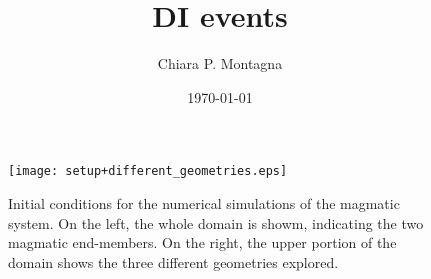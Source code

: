 \documentclass[fleqn,11pt]{article}
\begin{document}
\lstset{language=MATLAB,basicstyle=\small\ttfamily}
 

\title{\huge\bf DI events}
\author{Chiara P. Montagna}
\date{\today}
\maketitle

\begin{figure}[h]
  \centering
  \texttt{[image: setup+different\_geometries.eps]} %
  \caption{Initial conditions for the numerical simulations of the
    magmatic system. On the left, the whole domain is showm,
    indicating the two magmatic end-members. On the right, the upper
    portion of the domain shows the three different geometries
    explored.}
  \label{setup+different_geometries}
\end{figure}

 
\end{document}
